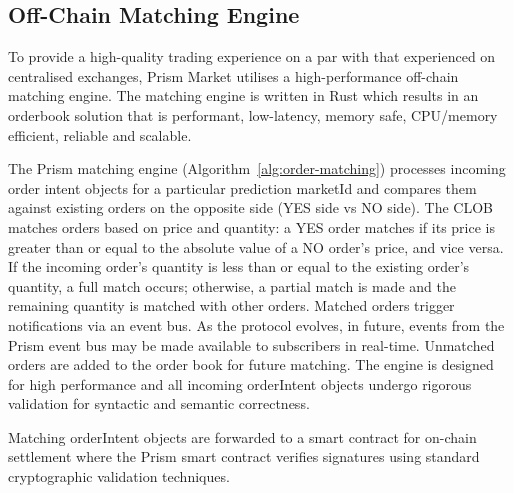 \documentclass[11pt,a4paper]{article}
\begin{document}
\subsection{Off-Chain Matching Engine}

To provide a high-quality trading experience on a par with that experienced on centralised exchanges, Prism Market utilises a high-performance off-chain matching engine. The matching engine is written in Rust which results in an orderbook solution that is performant, low-latency, memory safe, CPU/memory efficient, reliable and scalable.

The Prism matching engine (Algorithm~\ref{alg:order-matching}) processes incoming order intent objects for a particular prediction marketId and compares them against existing orders on the opposite side (YES side vs NO side). The CLOB matches orders based on price and quantity: a YES order matches if its price is greater than or equal to the absolute value of a NO order's price, and vice versa. If the incoming order's quantity is less than or equal to the existing order's quantity, a full match occurs; otherwise, a partial match is made and the remaining quantity is matched with other orders. Matched orders trigger notifications via an event bus. As the protocol evolves, in future, events from the Prism event bus may be made available to subscribers in real-time. Unmatched orders are added to the order book for future matching. The engine is designed for high performance and all incoming orderIntent objects undergo rigorous validation for syntactic and semantic correctness.

Matching orderIntent objects are forwarded to a smart contract for on-chain settlement where the Prism smart contract verifies signatures using standard cryptographic validation techniques.
\end{document}
